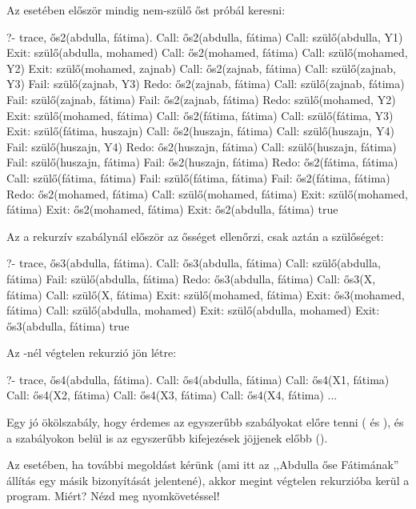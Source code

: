 Az  esetében először mindig nem-szülő őst
próbál keresni:
\begin{query}
?- trace, ős2(abdulla, fátima).
Call: ős2(abdulla, fátima)
  Call: szülő(abdulla, Y1)
  Exit: szülő(abdulla, mohamed)
  Call: ős2(mohamed, fátima)
    Call: szülő(mohamed, Y2)
    Exit: szülő(mohamed, zajnab)
    Call: ős2(zajnab, fátima)
      Call: szülő(zajnab, Y3)
      Fail: szülő(zajnab, Y3)
    Redo: ős2(zajnab, fátima)
      Call: szülő(zajnab, fátima)
      Fail: szülő(zajnab, fátima)
    Fail: ős2(zajnab, fátima)
    Redo: szülő(mohamed, Y2)
    Exit: szülő(mohamed, fátima)
    Call: ős2(fátima, fátima)
      Call: szülő(fátima, Y3)
      Exit: szülő(fátima, huszajn)
      Call: ős2(huszajn, fátima)
        Call: szülő(huszajn, Y4)
        Fail: szülő(huszajn, Y4)
      Redo: ős2(huszajn, fátima)
        Call: szülő(huszajn, fátima)
        Fail: szülő(huszajn, fátima)
      Fail: ős2(huszajn, fátima)
    Redo: ős2(fátima, fátima)
      Call: szülő(fátima, fátima)
      Fail: szülő(fátima, fátima)
    Fail: ős2(fátima, fátima)
  Redo: ős2(mohamed, fátima)
    Call: szülő(mohamed, fátima)
    Exit: szülő(mohamed, fátima)
  Exit: ős2(mohamed, fátima)
Exit: ős2(abdulla, fátima)
true
\end{query}

Az  a rekurzív szabálynál először az ősséget
ellenőrzi, csak aztán a szülőséget:
\begin{query}
?- trace, ős3(abdulla, fátima).
Call: ős3(abdulla, fátima)
  Call: szülő(abdulla, fátima)
  Fail: szülő(abdulla, fátima)
Redo: ős3(abdulla, fátima)
  Call: ős3(X, fátima)
    Call: szülő(X, fátima)
    Exit: szülő(mohamed, fátima)
  Exit: ős3(mohamed, fátima)
  Call: szülő(abdulla, mohamed)
  Exit: szülő(abdulla, mohamed)
Exit: ős3(abdulla, fátima)
true
\end{query}

Az -nél végtelen rekurzió jön létre:
\begin{query}
?- trace, ős4(abdulla, fátima).
Call: ős4(abdulla, fátima)
  Call: ős4(X1, fátima)
    Call: ős4(X2, fátima)
      Call: ős4(X3, fátima)
        Call: ős4(X4, fátima)
          ...
\end{query}

Egy jó ökölszabály, hogy érdemes az egyszerűbb
szabályokat előre tenni ( és ), és a
szabályokon belül is az egyszerűbb kifejezések
jöjjenek előbb ().

\begin{problem}
Az  esetében, ha további megoldást kérünk
(ami itt az ,,Abdulla őse Fátimának'' állítás egy
másik bizonyítását jelentené), akkor megint végtelen
rekurzióba kerül a program. Miért?  Nézd meg
nyomkövetéssel!
\end{problem}
